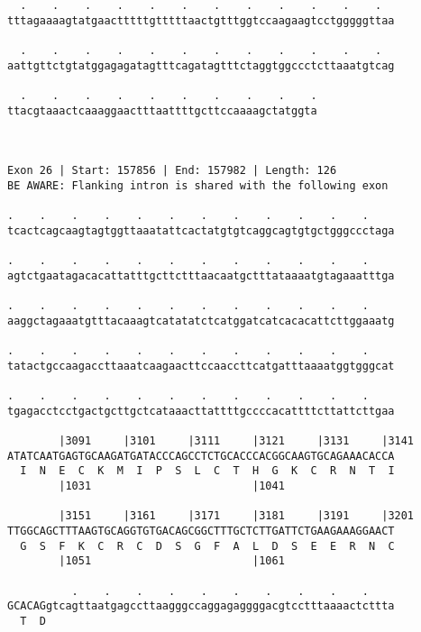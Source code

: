 \documentclass{article}
\begin{document}
\begin{Verbatim}
  .    .    .    .    .    .    .    .    .    .    .    .  
tttagaaaagtatgaactttttgtttttaactgtttggtccaagaagtcctgggggttaa
                                                            
  .    .    .    .    .    .    .    .    .    .    .    .  
aattgttctgtatggagagatagtttcagatagtttctaggtggccctcttaaatgtcag
                                                            
  .    .    .    .    .    .    .    .    .    .
ttacgtaaactcaaaggaactttaattttgcttccaaaagctatggta
                                                
                                                
 
Exon 26 | Start: 157856 | End: 157982 | Length: 126
BE AWARE: Flanking intron is shared with the following exon
 
.    .    .    .    .    .    .    .    .    .    .    .    
tcactcagcaagtagtggttaaatattcactatgtgtcaggcagtgtgctgggccctaga
                                                            
.    .    .    .    .    .    .    .    .    .    .    .    
agtctgaatagacacattatttgcttctttaacaatgctttataaaatgtagaaatttga
                                                            
.    .    .    .    .    .    .    .    .    .    .    .    
aaggctagaaatgtttacaaagtcatatatctcatggatcatcacacattcttggaaatg
                                                            
.    .    .    .    .    .    .    .    .    .    .    .    
tatactgccaagaccttaaatcaagaacttccaaccttcatgatttaaaatggtgggcat
                                                            
.    .    .    .    .    .    .    .    .    .    .    .    
tgagacctcctgactgcttgctcataaacttattttgccccacattttcttattcttgaa
                                                            
        |3091     |3101     |3111     |3121     |3131     |3141
ATATCAATGAGTGCAAGATGATACCCAGCCTCTGCACCCACGGCAAGTGCAGAAACACCA
  I  N  E  C  K  M  I  P  S  L  C  T  H  G  K  C  R  N  T  I
        |1031                         |1041                 
  
        |3151     |3161     |3171     |3181     |3191     |3201
TTGGCAGCTTTAAGTGCAGGTGTGACAGCGGCTTTGCTCTTGATTCTGAAGAAAGGAACT
  G  S  F  K  C  R  C  D  S  G  F  A  L  D  S  E  E  R  N  C
        |1051                         |1061                 
  
          .    .    .    .    .    .    .    .    .    .    
GCACAGgtcagttaatgagccttaagggccaggagaggggacgtcctttaaaactcttta
  T  D                                                      
                                                            

\end{Verbatim}
\end{document}
